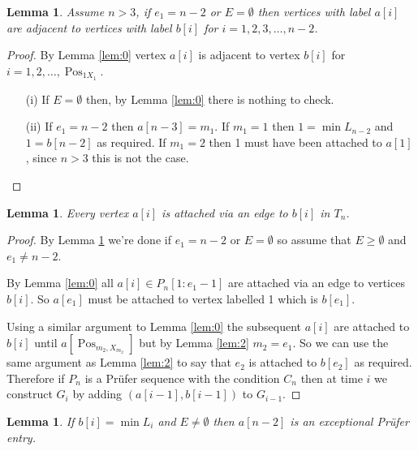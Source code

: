 \documentclass[10pt]{article} %
\newtheorem{lem}[thm]{Lemma}
\theoremstyle{definition}
\DeclareMathOperator{\Pos}{Pos}
\begin{document}
\begin{lem}\label{lem:7}
Assume $n >3$, if $e_{1} = n-2$ or $E = \emptyset$ then vertices with label $a[i]$ are adjacent to vertices with label $b[i]$ for $i = 1,2,3,\dots,n-2$.   
\end{lem}

\begin{proof}
By Lemma \ref{lem:0} vertex $a[i]$ is adjacent to vertex $b[i]$ for $i = 1,2,\dots,\Pos_{1X_{1}}$.  
\begin{itemize}
\item[(i)]
If $E = \emptyset$ then, by Lemma \ref{lem:0} there is nothing to check.   
\item[(ii)]
If $e_{1} = n-2$ then $a[n-3] = m_1$. If $m_1 = 1$ then $ 1 = \min L_{n-2}$ and $1  = b[n-2]$ as required.  If $m_1 = 2$  then 1 must have been attached to $a[1]$, since $n>3$ this is not the case.  
\end{itemize} 
\end{proof}

\begin{lem}
 Every vertex $a[i]$ is attached via an edge to $b[i]$ in $T_{n}$.  
\end{lem}
\begin{proof}
 By Lemma \ref{lem:7} we're done if $e_{1} = n-2$ or $E = \emptyset$ so assume that $E \geq \emptyset$ and $e_1 \neq n-2$.
 
 By Lemma \ref{lem:0} all $a[i] \in P_{n}[1:e_1 - 1]$ are attached via an edge to vertices $b[i]$.  So $a[e_1]$ must be attached to vertex labelled 1 which is $b[e_1]$.  
 
 Using a similar argument to Lemma \ref{lem:0} the subsequent $a[i]$ are attached to $b[i]$ until $a[\Pos_{m_{2},X_{m_{2}}}]$ but by Lemma \ref{lem:2} $m_{2} = e_{1}$.  So we can use the same argument as Lemma \ref{lem:2} to say that $e_{2}$ is attached to $b[e_2]$ as required.  Therefore if $P_{n}$ is a Pr\"{u}fer sequence with the condition $C_{n}$ then at time $i$ we construct $G_{i}$ by adding $(a[i-1],b[i-1])$ to $G_{i-1}$. 
 
 \end{proof}


\begin{lem}\label{lem:4}
 If $b[i] = \min L_{i}$ and $E \neq \emptyset$ then $a[n-2]$ is an exceptional Pr\"{u}fer entry.
\end{lem}
\end{document}
